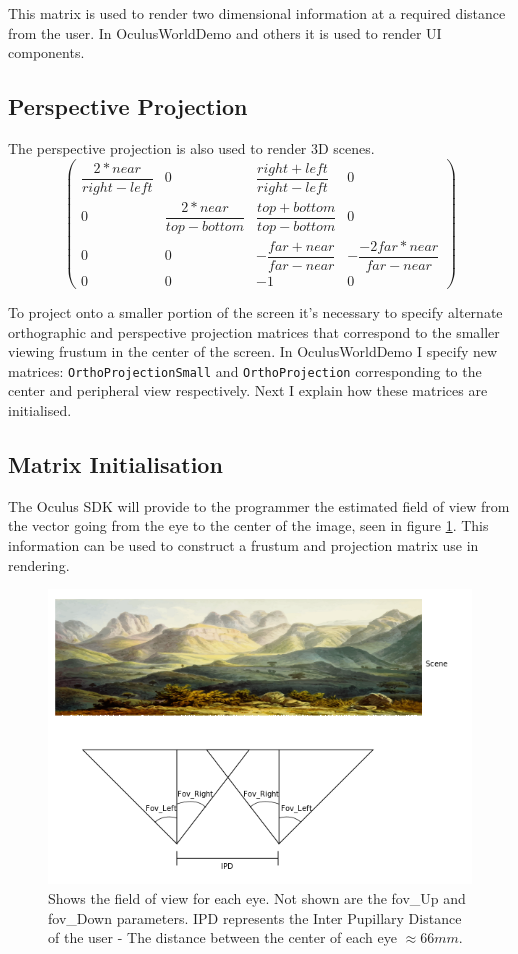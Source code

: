 \documentclass[12pt,a4paper,twoside,openright]{report}
\begin{document}
\noindent This matrix is used to render two dimensional information at a required distance from the user. In OculusWorldDemo and others it is used to render UI components.
\subsection{Perspective Projection}

The perspective projection is also used to render 3D scenes.
\[
\begin{pmatrix}
\dfrac{2*near}{right-left} & 0 & \dfrac{right + left}{right - left} & 0 \\
0 & \dfrac{2*near}{top-bottom} & \dfrac{top+bottom}{top-bottom} & 0 \\
0 & 0 & -\dfrac{far + near}{far-near} & -\dfrac{-2far*near}{far-near} \\
0 & 0 & -1 & 0
\end{pmatrix}
\]

\noindent To project onto a smaller portion of the screen it's necessary to specify alternate orthographic and perspective projection matrices that correspond to the smaller viewing frustum in the center of the screen. In OculusWorldDemo I specify new matrices: \texttt{OrthoProjectionSmall} and \texttt{OrthoProjection} corresponding to the center and peripheral view respectively. Next I explain how these matrices are initialised. 

\subsection{Matrix Initialisation}\label{matrix}

The Oculus SDK will provide to the programmer the estimated field of view from the vector going from the eye to the center of the image, seen in figure \ref{fig:fovfig}. This information can be used to construct a frustum and projection matrix use in rendering.

\begin{figure}[tbh]
\centerline{\includegraphics[scale=0.6]{figs/asymmetrical_fov.png}}
\caption{Shows the field of view for each eye. Not shown are the fov\_Up and fov\_Down parameters. IPD represents the Inter Pupillary Distance of the user - The distance between the center of each eye $\approx66mm$.}
\label{fig:fovfig}
\end{figure}
\end{document}
